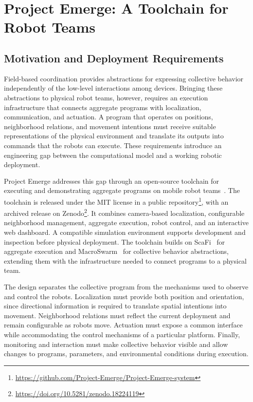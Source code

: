 \section[Project Emerge]{Project Emerge: A Toolchain for Robot Teams}
\label{sec:project-emerge}

\subsection{Motivation and Deployment Requirements}

Field-based coordination provides abstractions for expressing collective
 behavior independently of the low-level interactions among devices.
%
Bringing these abstractions to physical robot teams, however, requires an
 execution infrastructure that connects aggregate programs with localization,
 communication, and actuation.
%
A program that operates on positions, neighborhood relations, and movement
 intentions must receive suitable representations of the physical environment
 and translate its outputs into commands that the robots can execute.
%
These requirements introduce an engineering gap between the computational
 model and a working robotic deployment.

Project Emerge addresses this gap through an open-source toolchain for
 executing and demonstrating aggregate programs on mobile robot
 teams~\cite{DBLP:journals/scp/FarabegoliABCDPV}.
%
The toolchain is released under the MIT license in a public
 repository\footnote{\url{https://github.com/Project-Emerge/Project-Emerge-system}},
 with an archived release on
 Zenodo\footnote{\url{https://doi.org/10.5281/zenodo.18224119}}.
%
It combines camera-based localization, configurable neighborhood management,
 aggregate execution, robot control, and an interactive web dashboard.
%
A compatible simulation environment supports development and inspection
 before physical deployment.
%
The toolchain builds on ScaFi~\cite{DBLP:journals/softx/CasadeiVAP22} for
 aggregate execution and
 MacroSwarm~\cite{DBLP:journals/lmcs/AguzziCV25} for collective behavior
 abstractions, extending them with the infrastructure needed to connect
 programs to a physical team.

The design separates the collective program from the mechanisms used to
 observe and control the robots.
%
Localization must provide both position and orientation, since directional
 information is required to translate spatial intentions into movement.
%
Neighborhood relations must reflect the current deployment and remain
 configurable as robots move.
%
Actuation must expose a common interface while accommodating the control
 mechanisms of a particular platform.
%
Finally, monitoring and interaction must make collective behavior visible
 and allow changes to programs, parameters, and environmental conditions
 during execution.


